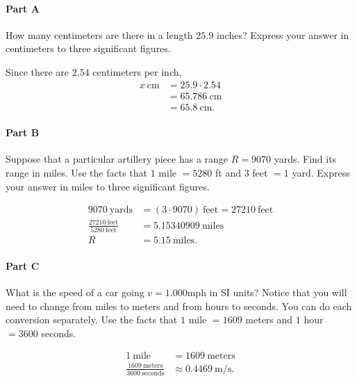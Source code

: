 \paragraph{Part A}
How many centimeters are there in a length $25.9$ inches? Express your answer in centimeters to three significant figures.

\vspace{1em}

\begin{solution}
	Since there are $2.54$ centimeters per inch,
	\begin{align*}
		x~\text{cm} &= 25.9 \cdot 2.54 \\
		&= 65.786~\text{cm} \\
		&= 65.8~\text{cm}
		.\end{align*}
\end{solution}

\paragraph{Part B}
Suppose that a particular artillery piece has a range $R=9070$ yards. Find its range in miles. Use the facts that $1$ mile $= 5280$ ft and $3$ feet $= 1$ yard. Express your answer in miles to three significant figures.

\vspace{1em}

\begin{solution}
	\begin{align*}
		9070~\text{yards} &= \left( 3 \cdot 9070 \right)~\text{feet} = 27210~\text{feet} \\
		\frac{27210~\text{feet}}{5280~\text{feet}} &= 5.15340909~\text{miles} \\
		R &= 5.15~\text{miles}
		.\end{align*}
\end{solution}

\paragraph{Part C}
What is the speed of a car going $v=1.000$mph in SI units? Notice that you will need to change from miles to meters and from hours to seconds. You can do each conversion separately. Use the facts that $1$ mile $= 1609$ meters and $1$ hour $= 3600$ seconds.

\begin{solution}
	\begin{align*}
		1~\text{mile} &= 1609~ \text{meters} \\
		\frac{1609~\text{meters}}{3600~\text{seconds}} &\approx 0.4469~\text{m/s}
		.\end{align*}
\end{solution}

